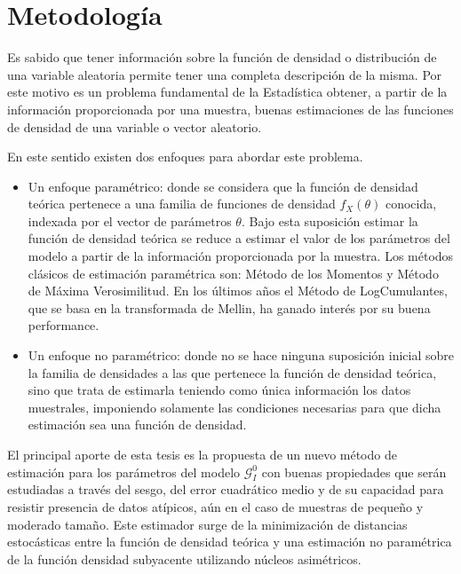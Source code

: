 
\chapter{Metodología}
\label{metodologia}

Es sabido que tener información sobre la función de densidad o distribución de una variable aleatoria permite tener una completa descripción de la misma. Por este motivo es un problema fundamental de la Estadística obtener, a partir de la información proporcionada por una muestra,  buenas estimaciones de las funciones de densidad de una variable o vector aleatorio. 

En este sentido existen dos enfoques para abordar este problema. 

\begin{itemize}
	\item Un enfoque paramétrico: donde se considera que la función de densidad teórica pertenece a una familia de funciones de densidad $f_X(\theta)$ conocida, indexada por el vector de parámetros $\theta$. Bajo esta suposición estimar la función de densidad teórica se reduce a estimar el valor de los parámetros del modelo a partir de la información proporcionada por la muestra. Los métodos clásicos de estimación paramétrica son: Método de los Momentos y Método de Máxima Verosimilitud. En los últimos años el Método de LogCumulantes, que se basa en la transformada de Mellin, ha ganado interés por su buena performance.
	\item Un enfoque no paramétrico: donde no se hace ninguna suposición inicial sobre la familia de densidades a las que pertenece la función de densidad teórica, sino que trata de estimarla teniendo como única información los datos muestrales, imponiendo  solamente las condiciones necesarias para que dicha estimación sea una función de densidad.
\end{itemize}

El principal aporte de esta tesis es la propuesta de un nuevo método de estimación para los parámetros del modelo $\mathcal G_I^0$ con buenas propiedades que serán estudiadas a través del sesgo, del error cuadrático medio y de su capacidad para resistir presencia de datos atípicos, aún en el caso de muestras de pequeño y moderado tamaño. Este estimador surge de la minimización de distancias estocásticas entre la función de densidad teórica y una estimación no paramétrica de la función densidad subyacente utilizando núcleos asimétricos. 

